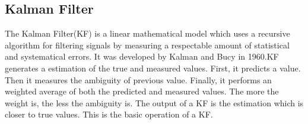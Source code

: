 \subsection{Kalman Filter}
The Kalman Filter(KF) is a linear mathematical model which uses a recursive algorithm for filtering signals by measuring a respectable amount of statistical and systematical errors\cite{Wilfried2002}. It was developed by Kalman and Bucy in 1960\cite{Wilfried2002}.KF generates a estimation of the true and measured values\cite{aich2010study}. First, it predicts a value. Then it measures the ambiguity of previous value. Finally, it performs an weighted average of both the predicted and measured values\cite{aich2010study}.
The more the weight is, the less the ambiguity is. The output of a KF is the estimation which is closer to true values. This is the basic operation of a KF.

